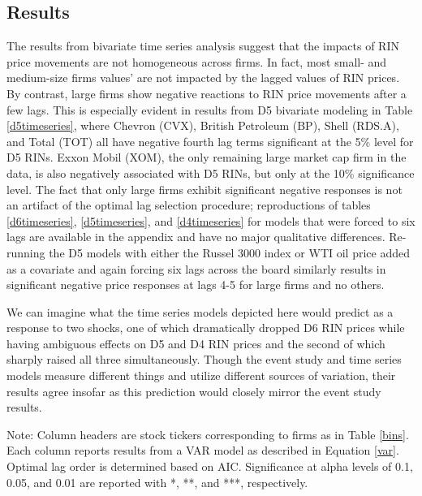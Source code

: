 \documentclass[11pt]{article}
\begin{document}
\subsection{Results}

The results from bivariate time series analysis suggest that the impacts of RIN price movements are not homogeneous across firms. In fact, most small- and medium-size firms values' are not impacted by the lagged values of RIN prices. By contrast, large firms show negative reactions to RIN price movements after a few lags. This is especially evident in results from D5 bivariate modeling in Table \ref{d5timeseries}, where Chevron (CVX), British Petroleum (BP), Shell (RDS.A), and Total (TOT) all have negative fourth lag terms significant at the 5\% level for D5 RINs. Exxon Mobil (XOM), the only remaining large market cap firm in the data, is also negatively associated with D5 RINs, but only at the 10\% significance level. The fact that only large firms exhibit significant negative responses is not an artifact of the optimal lag selection procedure; reproductions of tables \ref{d6timeseries}, \ref{d5timeseries}, and \ref{d4timeseries} for models that were forced to six lags are available in the appendix and have no major qualitative differences. Re-running the D5 models with either the Russel 3000 index or WTI oil price added as a covariate and again forcing six lags across the board similarly results in significant negative price responses at lags 4-5 for large firms and no others.

We can imagine what the time series models depicted here would predict as a response to two shocks, one of which dramatically dropped D6 RIN prices while having ambiguous effects on D5 and D4 RIN prices and the second of which sharply raised all three simultaneously. Though the event study and time series models measure different things and utilize different sources of variation, their results agree insofar as this prediction would closely mirror the event study results.


\begin{table}[!ht] \centering 
	\caption{Bivariate Time Series Model with D6 RINs} 
	\label{d6timeseries} 
	\begin{flushleft}
		\scriptsize{Note: Column headers are stock tickers corresponding to firms as in Table \ref{bins}. Each column reports results from a VAR model as described in Equation \ref{var}. Optimal lag order is determined based on AIC. Significance at alpha levels of 0.1, 0.05, and 0.01 are reported with *, **, and ***, respectively.}\\
	\end{flushleft}
\end{table} 
\end{document}
